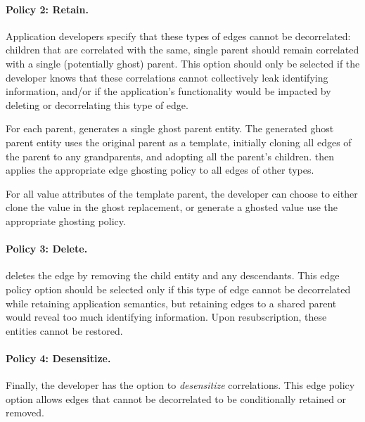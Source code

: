 %
%
\paragraph{Policy 2: Retain.}
Application developers specify that these types of edges cannot be decorrelated: children 
that are correlated with the same, single parent should remain correlated with a single (potentially
ghost) parent. This option should only be selected if the developer knows that these correlations
cannot collectively leak identifying information, and/or if the application's functionality would be
impacted by deleting or decorrelating this type of edge.

For each parent, \sys generates a single ghost parent entity. The generated ghost parent
entity uses the original parent as a template, initially cloning all edges of the parent to any grandparents,
and adopting all the parent's children. \sys then applies the appropriate edge ghosting policy
to all edges of other types.

For all value attributes of the template parent, the
developer can choose to either clone the value in the ghost replacement, or generate a ghosted value
use the appropriate ghosting policy.

\paragraph{Policy 3: Delete.}
\sys deletes the edge by removing the child entity and any descendants.  This edge policy option
should be selected only if this type of edge cannot be decorrelated while retaining application
semantics, but retaining edges to a shared parent would reveal too much identifying information.
Upon resubscription, these entities cannot be restored.

\paragraph{Policy 4: Desensitize.}
Finally, the developer has the option to \emph{desensitize} correlations. This edge policy option
allows edges that cannot be decorrelated to be conditionally retained or removed.

